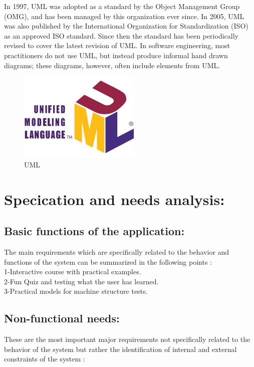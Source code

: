 In 1997, UML was adopted as a standard by the Object Management Group (OMG), and has been managed by this organization ever since. In 2005, UML was also published by the International Organization for Standardization (ISO) as an approved ISO standard. Since then the standard has been periodically revised to cover the latest revision of UML. In software engineering, most practitioners do not use UML, but instead produce informal hand drawn diagrams; these diagrams, however, often include elements from UML.\cite{YThi-UML}








\begin{figure}[ht]
	\centering
	\label{}\includegraphics[scale=0.95]{img/UML.png}                
	\vspace*{13pt}
	\caption{UML} 
	\label{fig:UML}
\end{figure} 



\section{Specication and needs analysis:}

\subsection{Basic functions of the application:}
The main requirements which are specifically related to the behavior and functions of the system can be summarized in the following points :\\
1-Interactive course with practical examples.\\
2-Fun Quiz and testing what the user has learned.\\
3-Practical models for machine structure tests.\\
\subsection{Non-functional needs:}
These are the most important major requirements not specifically related to the behavior of the system but rather the identification of internal and external constraints of the system :
